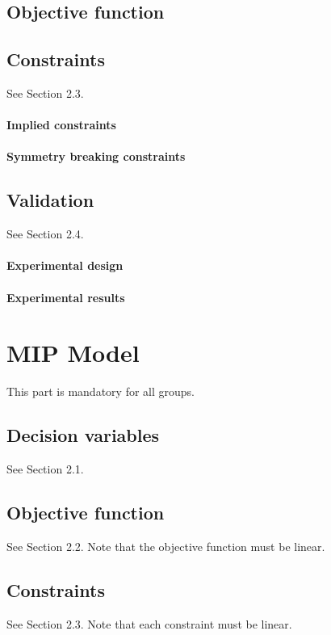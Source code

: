 \documentclass{article}
\begin{document}
\subsection{Objective function}

\subsection{Constraints}
See Section 2.3.

\paragraph{Implied constraints}

\paragraph{Symmetry breaking constraints}

\subsection{Validation}
See Section 2.4.

\paragraph{Experimental design}

\paragraph{Experimental results}


\section{MIP Model}
This part is mandatory for all groups.

\subsection{Decision variables}
See Section 2.1.

\subsection{Objective function}
See Section 2.2. Note that the objective function must be linear.

\subsection{Constraints}
See Section 2.3. Note that each constraint must be linear.
\end{document}
